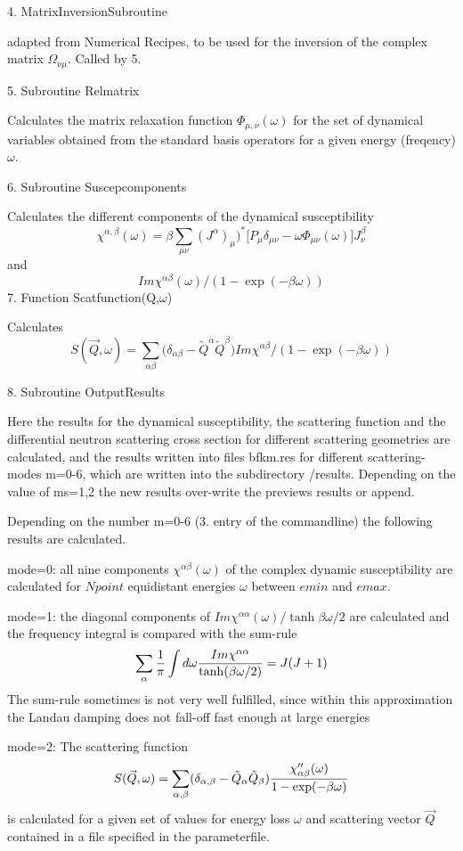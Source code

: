4. MatrixInversionSubroutine

adapted from Numerical Recipes, to be used for the inversion of the complex
matrix $\Omega_{\nu\mu}$. Called by 5. 

5. Subroutine Relmatrix

Calculates the matrix relaxation function $\Phi_{\mu,\nu}(\omega)$ for the set 
of dynamical variables
obtained from  the standard basis operators for a given energy (freqency)
$\omega$.

6. Subroutine Suscepcomponents 

Calculates the different components of the
dynamical susceptibility
$$
\chi^{\alpha,\beta}(\omega) = \beta\sum_{\mu \nu}(J^\alpha)_\mu)^*
\bigl[P_\mu\delta_{\mu\nu}-\omega \Phi_{\mu\nu}(\omega)\bigr]J^\beta_\nu
$$ 
and 
$$
Im \chi^{\alpha\beta}(\omega)/(1-\exp(-\beta\omega))
$$
7. Function Scatfunction(Q,$\omega$)

Calculates
$$
S(\vec Q,\omega)= \sum_{\alpha\beta}\bigl(\delta_{\alpha\beta} - \tilde
Q^\alpha\tilde Q^\beta\bigr) Im \chi^{\alpha\beta}/(1-\exp(-\beta\omega))
$$


8. Subroutine OutputResults 

Here the results for the dynamical susceptibility, the scattering function
and the differential neutron scattering cross section for different
scattering geometries are calculated, and the results written into files 
bfkm.res for different scattering-modes m=0-6, which are written into the  
subdirectory /results. Depending on the value of ms=1,2 the new results
over-write the previews results or append.  

Depending on the number m=0-6 (3. entry of the commandline) the following
results are calculated. 

mode=0: all nine components $\chi^{\alpha\beta}(\omega)$  of the complex 
dynamic susceptibility are calculated for $Npoint$ equidistant energies  $\omega$ 
between $emin$ and $emax$. 

mode=1: the diagonal components of $Im \chi^{\alpha\alpha}(\omega)/\tanh{\beta\omega/2}$
are calculated and the frequency integral is compared with the sum-rule 
$$
\sum_\alpha {1\over\pi}\int d\omega {Im
\chi^{\alpha\alpha}\over \tanh(\beta\omega/2)} 
= J(J+1) 
$$
The sum-rule sometimes is not very well fulfilled, since within this
approximation the Landau damping does not fall-off fast enough at large
energies

mode=2: The scattering function 
$$
S(\vec Q,\omega)=\sum_{\alpha,\beta} (\delta_{\alpha, \beta}- \tilde Q_\alpha \tilde
Q_\beta){ \chi''_{\alpha \beta}(\omega)\over 1-\exp(-\beta\omega)}
$$ 
is calculated for a given set of values for  
energy loss $\omega$ and scattering vector $\vec Q$ contained in a file
specified in the parameterfile. 

